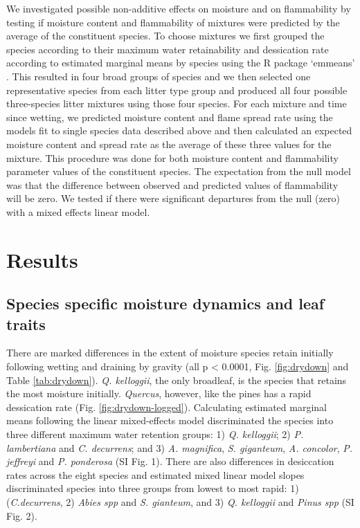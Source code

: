 \documentclass[fire,article,submit,moreauthors,pdftex]{Definitions/mdpi}
\begin{document}
We investigated possible non-additive effects on moisture and on flammability
by testing if moisture content and flammability of mixtures were predicted by
the average of the constituent species. To choose mixtures we first grouped the
species according to their maximum water retainability and dessication rate
according to estimated marginal means by species using the R package `emmeans'
\cite{Lenth-2019}. This resulted in four broad groups of species and we then
selected one representative species from each litter type group and produced
all four possible three-species litter mixtures using those four species. For
each mixture and time since wetting, we predicted moisture content and flame
spread rate using the models fit to single species data described above and
then calculated an expected moisture content and spread rate as the average of
these three values for the mixture. This procedure was done for both moisture
content and flammability parameter values of the constituent species. The
expectation from the null model was that the difference between observed and
predicted values of flammability will be zero. We tested if there were
significant departures from the null (zero) with a mixed effects linear model.


\section{Results}

\subsection{Species specific moisture dynamics and leaf traits}

There are marked differences in the extent of moisture species retain initially
following wetting and draining by gravity (all p < 0.0001, Fig.
\ref{fig:drydown} and Table \ref{tab:drydown}). \emph{Q. kelloggii}, the only
broadleaf, is the species that retains the most moisture initially.
\emph{Quercus}, however, like the pines has a rapid dessication rate (Fig.
\ref{fig:drydown-logged}). Calculating estimated marginal means following the
linear mixed-effects model discriminated the species into three different
maximum water retention groups: 1) \emph{Q. kelloggii}; 2) \emph{P.
  lambertiana} and \emph{C. decurrens}; and 3) \emph{A. magnifica}, \emph{S.
  giganteum}, \emph{A. concolor}, \emph{P. jeffreyi} and \emph{P. ponderosa}
(SI Fig. 1). There are also differences in desiccation rates across the eight
species and estimated mixed linear model slopes discriminated species into
three groups from lowest to most rapid: 1) (\emph{C.decurrens}, 2) \emph{Abies
  spp} and \emph{S. gianteum}, and 3) \emph{Q. kelloggii} and \emph{Pinus spp}
(SI Fig. 2).
\end{document}
